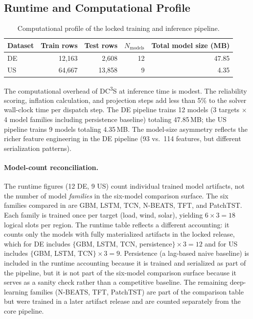 \documentclass[11pt,a4paper]{article}
\begin{document}
\subsection{Runtime and Computational Profile}\label{sec:runtime}

\begin{table}[htbp]
\centering\small
\caption{Computational profile of the locked training and inference pipeline.}
\label{tab:runtime}
\begin{tabular}{lrrrr}
\toprule
Dataset & Train rows & Test rows & $N_{\text{models}}$ & Total model size (MB) \\
\midrule
DE & 12{,}163 & 2{,}608 & 12 & 47.85 \\
US & 64{,}667 & 13{,}858 & 9 & 4.35 \\
\bottomrule
\end{tabular}
\end{table}

The computational overhead of DC\textsuperscript{3}S at inference time is modest. The reliability scoring, inflation calculation, and projection steps add less than 5\% to the solver wall-clock time per dispatch step. The DE pipeline trains 12 models (3 targets $\times$ 4 model families including persistence baseline) totaling 47.85\,MB; the US pipeline trains 9 models totaling 4.35\,MB. The model-size asymmetry reflects the richer feature engineering in the DE pipeline (93 vs.~114 features, but different serialization patterns).

\paragraph{Model-count reconciliation.} The runtime figures (12 DE, 9 US) count individual trained model artifacts, not the number of model \emph{families} in the six-model comparison surface. The six families compared in  are GBM, LSTM, TCN, N-BEATS, TFT, and PatchTST. Each family is trained once per target (load, wind, solar), yielding $6 \times 3 = 18$ logical slots per region. The runtime table reflects a different accounting: it counts only the models with fully materialized artifacts in the locked release, which for DE includes $\{$GBM, LSTM, TCN, persistence$\} \times 3 = 12$ and for US includes $\{$GBM, LSTM, TCN$\} \times 3 = 9$. Persistence (a lag-based naive baseline) is included in the runtime accounting because it is trained and serialized as part of the pipeline, but it is not part of the six-model comparison surface because it serves as a sanity check rather than a competitive baseline. The remaining deep-learning families (N-BEATS, TFT, PatchTST) are part of the comparison table but were trained in a later artifact release and are counted separately from the core pipeline.
\end{document}
